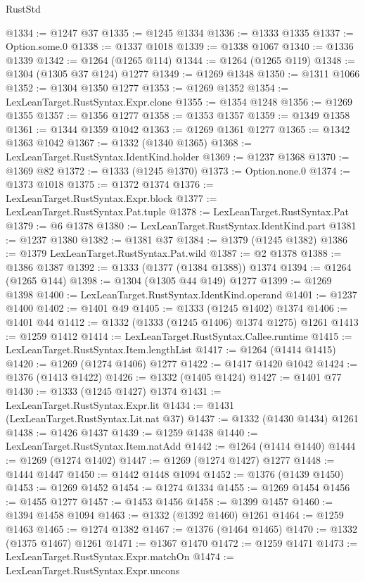 \begin{lexlean}{RustStd}
\begin{coremodule}
{\begin{coremodule}
{{{{{{{{{{{{{{{{{{{{{{{{{{{{{{{{{{{@1334 := @1247 @37
@1335 := @1245 @1334
@1336 := @1333 @1335
@1337 := Option.some.{0}
@1338 := @1337 @1018
@1339 := @1338 @1067
@1340 := @1336 @1339
@1342 := @1264 (@1265 @114)
@1344 := @1264 (@1265 @119)
@1348 := @1304 (@1305 @37 @124) @1277
@1349 := @1269 @1348
@1350 := @1311 @1066
@1352 := @1304 @1350 @1277
@1353 := @1269 @1352
@1354 := LexLeanTarget.RustSyntax.Expr.clone
@1355 := @1354 @1248
@1356 := @1269 @1355
@1357 := @1356 @1277
@1358 := @1353 @1357
@1359 := @1349 @1358
@1361 := @1344 @1359 @1042
@1363 := @1269 @1361 @1277
@1365 := @1342 @1363 @1042
@1367 := @1332 (@1340 @1365)
@1368 := LexLeanTarget.RustSyntax.IdentKind.holder
@1369 := @1237 @1368
@1370 := @1369 @82
@1372 := @1333 (@1245 @1370)
@1373 := Option.none.{0}
@1374 := @1373 @1018
@1375 := @1372 @1374
@1376 := LexLeanTarget.RustSyntax.Expr.block
@1377 := LexLeanTarget.RustSyntax.Pat.tuple
@1378 := LexLeanTarget.RustSyntax.Pat
@1379 := @6 @1378
@1380 := LexLeanTarget.RustSyntax.IdentKind.part
@1381 := @1237 @1380
@1382 := @1381 @37
@1384 := @1379 (@1245 @1382)
@1386 := @1379 LexLeanTarget.RustSyntax.Pat.wild
@1387 := @2 @1378
@1388 := @1386 @1387
@1392 := @1333 (@1377 (@1384 @1388)) @1374
@1394 := @1264 (@1265 @144)
@1398 := @1304 (@1305 @44 @149) @1277
@1399 := @1269 @1398
@1400 := LexLeanTarget.RustSyntax.IdentKind.operand
@1401 := @1237 @1400
@1402 := @1401 @49
@1405 := @1333 (@1245 @1402) @1374
@1406 := @1401 @44
@1412 := @1332 (@1333 (@1245 @1406) @1374 @1275) @1261
@1413 := @1259 @1412
@1414 := LexLeanTarget.RustSyntax.Callee.runtime
@1415 := LexLeanTarget.RustSyntax.Item.lengthList
@1417 := @1264 (@1414 @1415)
@1420 := @1269 (@1274 @1406) @1277
@1422 := @1417 @1420 @1042
@1424 := @1376 (@1413 @1422)
@1426 := @1332 (@1405 @1424)
@1427 := @1401 @77
@1430 := @1333 (@1245 @1427) @1374
@1431 := LexLeanTarget.RustSyntax.Expr.lit
@1434 := @1431 (LexLeanTarget.RustSyntax.Lit.nat @37)
@1437 := @1332 (@1430 @1434) @1261
@1438 := @1426 @1437
@1439 := @1259 @1438
@1440 := LexLeanTarget.RustSyntax.Item.natAdd
@1442 := @1264 (@1414 @1440)
@1444 := @1269 (@1274 @1402)
@1447 := @1269 (@1274 @1427) @1277
@1448 := @1444 @1447
@1450 := @1442 @1448 @1094
@1452 := @1376 (@1439 @1450)
@1453 := @1269 @1452
@1454 := @1274 @1334
@1455 := @1269 @1454
@1456 := @1455 @1277
@1457 := @1453 @1456
@1458 := @1399 @1457
@1460 := @1394 @1458 @1094
@1463 := @1332 (@1392 @1460) @1261
@1464 := @1259 @1463
@1465 := @1274 @1382
@1467 := @1376 (@1464 @1465)
@1470 := @1332 (@1375 @1467) @1261
@1471 := @1367 @1470
@1472 := @1259 @1471
@1473 := LexLeanTarget.RustSyntax.Expr.matchOn
@1474 := LexLeanTarget.RustSyntax.Expr.uncons
}}}}}}}}}}}}}}}}}}}}}}}}}}}}}}}}}}}
\end{coremodule}}
\end{coremodule}
\end{lexlean}
